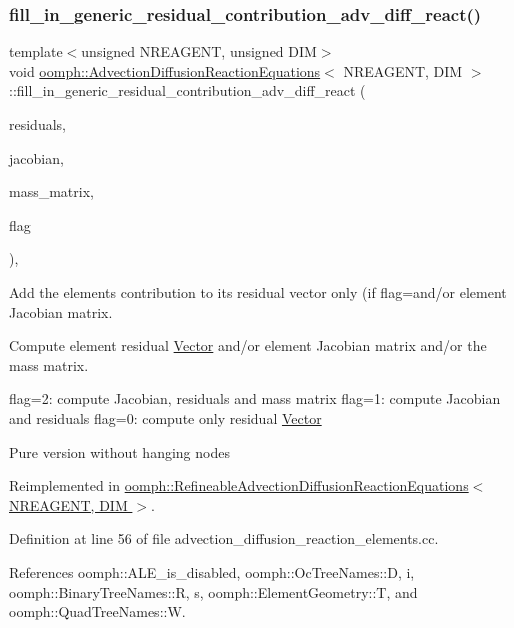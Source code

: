 \subsubsection{\texorpdfstring{fill\+\_\+in\+\_\+generic\+\_\+residual\+\_\+contribution\+\_\+adv\+\_\+diff\+\_\+react()}{fill\_in\_generic\_residual\_contribution\_adv\_diff\_react()}}
{\footnotesize\ttfamily template$<$unsigned N\+R\+E\+A\+G\+E\+NT, unsigned D\+IM$>$ \\
void \hyperlink{classoomph_1_1AdvectionDiffusionReactionEquations}{oomph\+::\+Advection\+Diffusion\+Reaction\+Equations}$<$ N\+R\+E\+A\+G\+E\+NT, D\+IM $>$\+::fill\+\_\+in\+\_\+generic\+\_\+residual\+\_\+contribution\+\_\+adv\+\_\+diff\+\_\+react (\begin{DoxyParamCaption}\item[{\hyperlink{classoomph_1_1Vector}{Vector}$<$ double $>$ \&}]{residuals,  }\item[{\hyperlink{classoomph_1_1DenseMatrix}{Dense\+Matrix}$<$ double $>$ \&}]{jacobian,  }\item[{\hyperlink{classoomph_1_1DenseMatrix}{Dense\+Matrix}$<$ double $>$ \&}]{mass\+\_\+matrix,  }\item[{unsigned}]{flag }\end{DoxyParamCaption})\hspace{0.3cm}{\ttfamily [protected]}, {\ttfamily [virtual]}}



Add the element\textquotesingle{}s contribution to its residual vector only (if flag=and/or element Jacobian matrix. 

Compute element residual \hyperlink{classoomph_1_1Vector}{Vector} and/or element Jacobian matrix and/or the mass matrix.

flag=2\+: compute Jacobian, residuals and mass matrix flag=1\+: compute Jacobian and residuals flag=0\+: compute only residual \hyperlink{classoomph_1_1Vector}{Vector}

Pure version without hanging nodes 

Reimplemented in \hyperlink{classoomph_1_1RefineableAdvectionDiffusionReactionEquations_ac00be5fb705024129d006f2ed2d80eab}{oomph\+::\+Refineable\+Advection\+Diffusion\+Reaction\+Equations$<$ N\+R\+E\+A\+G\+E\+N\+T, D\+I\+M $>$}.



Definition at line 56 of file advection\+\_\+diffusion\+\_\+reaction\+\_\+elements.\+cc.



References oomph\+::\+A\+L\+E\+\_\+is\+\_\+disabled, oomph\+::\+Oc\+Tree\+Names\+::D, i, oomph\+::\+Binary\+Tree\+Names\+::R, s, oomph\+::\+Element\+Geometry\+::T, and oomph\+::\+Quad\+Tree\+Names\+::W.



